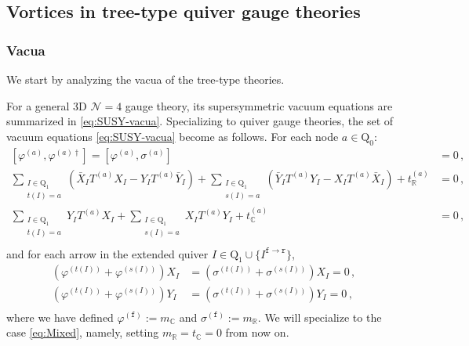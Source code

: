 \documentclass[12pt,a4paper]{article}
\renewcommand{\(}{\left(}
\renewcommand{\)}{\right)}
\renewcommand{\(}{\left(}
\renewcommand{\)}{\right)}
\begin{document}
\subsection{Vortices in tree-type quiver gauge theories}
\subsubsection{Vacua}\label{sssec:vacua}

We start by analyzing the vacua of the tree-type theories. 

For a general 3D $\mathcal{N}=4$ gauge theory, its supersymmetric vacuum equations are summarized in \eqref{eq:SUSY-vacua}.
Specializing to quiver gauge theories, the set of vacuum equations \eqref{eq:SUSY-vacua} become as follows. For each node $a\in \textrm{Q}_0$:
\begin{equation}
\begin{aligned}
[\varphi^{(a)},\varphi^{(a)\dag}]=[\varphi^{(a)},\sigma^{(a)}]&=0\,,\\
\sum_{\substack{I\in\textrm{Q}_1 \\ t(I)=a}}
(\bar{X}_{I}T^{(a)}X_I-Y_I T^{(a)}\bar{Y}_I)+\sum_{\substack{I\in\textrm{Q}_1 \\ s(I)=a}}(\bar{Y}_I T^{(a)}Y_I-X_{I}T^{(a)}\bar{X}_I)+t_{\mathbb{R}}^{(a)}&=0\,,\\
\sum_{\substack{I\in\textrm{Q}_1 \\ t(I)=a}}
Y_I T^{(a)}X_I+\sum_{\substack{I\in\textrm{Q}_1 \\ s(I)=a}}X_I T^{(a)}Y_I+t_{\mathbb{C}}^{(a)}&=0\,,\\
\end{aligned}
\end{equation}
and for each arrow in the extended quiver $I\in\textrm{Q}_1\cup\{I^{\mathtt{f}\to\mathtt{r}}\}$,
\begin{equation}
\begin{aligned}
(\varphi^{(t(I))}+\varphi^{(s(I))})X_I&=(\sigma^{(t(I))}+\sigma^{(s(I))})X_I=0\,,\\
(\varphi^{(t(I))}+\varphi^{(s(I))})Y_I&=(\sigma^{(t(I))}+\sigma^{(s(I))})Y_I=0\,,\\
\end{aligned}
\end{equation}
where we have defined $\varphi^{(\mathtt{f})}:=m_{\mathbb{C}}$ and $\sigma^{(\mathtt{f})}:=m_{\mathbb{R}}$. 
We will specialize to the case \eqref{eq:Mixed}, namely, setting $m_\mathbb{R}=t_{\mathbb{C}}=0$ from now on.


\medskip
\end{document}
